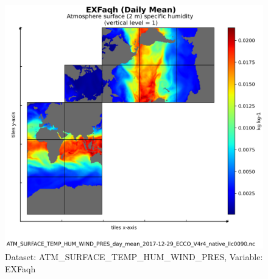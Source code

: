\begin{figure}[H]
\centering
\includegraphics[scale=0.55]{../images/plots/v4r4/native_plots/Atmosphere_Surface_Temperature_Humidity_Wind_and_Pressure/EXFaqh.png}
\caption{Dataset: ATM\_SURFACE\_TEMP\_HUM\_WIND\_PRES, Variable: EXFaqh}
\label{tab:table-ATM_SURFACE_TEMP_HUM_WIND_PRES_EXFaqh-Plot}
\end{figure}
\newpage
\pagebreak
